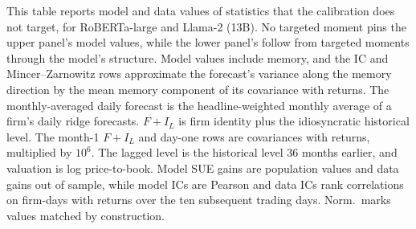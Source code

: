 \documentclass[11pt,letterpaper]{article}
\theoremstyle{remark}
\begin{document}
\begin{table}[htbp]
\centering
\caption{Model and Data Statistics outside the Targets}
\label{tab:tab13}
\begin{minipage}{\linewidth}\footnotesize
This table reports model and data values of statistics that the calibration does not target, for RoBERTa-large and Llama-2 (13B). No targeted moment pins the upper panel's model values, while the lower panel's follow from targeted moments through the model's structure. Model values include memory, and the IC and Mincer--Zarnowitz rows approximate the forecast's variance along the memory direction by the mean memory component of its covariance with returns. The monthly-averaged daily forecast is the headline-weighted monthly average of a firm's daily ridge forecasts. $F+I_L$ is firm identity plus the idiosyncratic historical level. The month-1 $F+I_L$ and day-one rows are covariances with returns, multiplied by $10^6$. The lagged level is the historical level 36 months earlier, and valuation is log price-to-book. Model SUE gains are population values and data gains out of sample, while model ICs are Pearson and data ICs rank correlations on firm-days with returns over the ten subsequent trading days. Norm.\ marks values matched by construction.
\end{minipage}
\medskip


\end{table}
\end{document}
